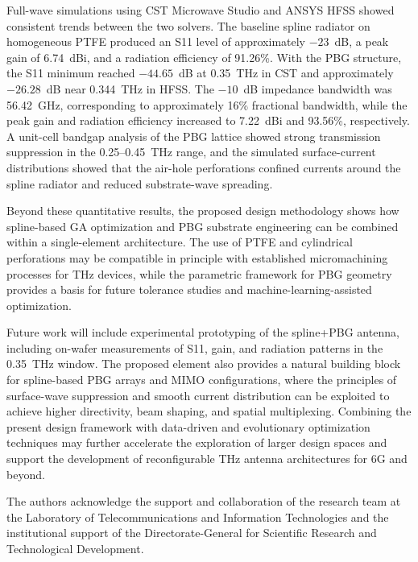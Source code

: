 \documentclass[USenglish]{article}
\begin{document}
Full-wave simulations using CST Microwave Studio and ANSYS HFSS showed consistent trends between the two solvers. The baseline spline radiator on homogeneous PTFE produced an S11 level of approximately $-23$~dB, a peak gain of 6.74~dBi, and a radiation efficiency of 91.26\%. With the PBG structure, the S11 minimum reached $-44.65$~dB at 0.35~THz in CST and approximately $-26.28$~dB near 0.344~THz in HFSS. The \(-10\)~dB impedance bandwidth was 56.42~GHz, corresponding to approximately 16\% fractional bandwidth, while the peak gain and radiation efficiency increased to 7.22~dBi and 93.56\%, respectively. A unit-cell bandgap analysis of the PBG lattice showed strong transmission suppression in the 0.25--0.45~THz range, and the simulated surface-current distributions showed that the air-hole perforations confined currents around the spline radiator and reduced substrate-wave spreading.

Beyond these quantitative results, the proposed design methodology shows how spline-based GA optimization and PBG substrate engineering can be combined within a single-element architecture. The use of PTFE and cylindrical perforations may be compatible in principle with established micromachining processes for THz devices, while the parametric framework for PBG geometry provides a basis for future tolerance studies and machine-learning-assisted optimization.

Future work will include experimental prototyping of the spline+PBG antenna, including on-wafer measurements of S11, gain, and radiation patterns in the 0.35~THz window. The proposed element also provides a natural building block for spline-based PBG arrays and MIMO configurations, where the principles of surface-wave suppression and smooth current distribution can be exploited to achieve higher directivity, beam shaping, and spatial multiplexing. Combining the present design framework with data-driven and evolutionary optimization techniques may further accelerate the exploration of larger design spaces and support the development of reconfigurable THz antenna architectures for 6G and beyond.




\begin{acknowledgement}
The authors acknowledge the support and collaboration of the research team at the Laboratory of Telecommunications and Information Technologies and the institutional support of the Directorate-General for Scientific Research and Technological Development.
\end{acknowledgement}
\end{document}

